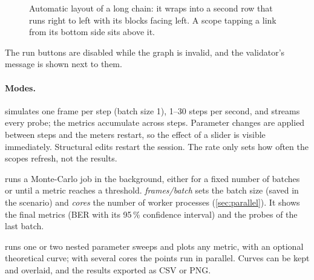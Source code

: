 \begin{figure}[htbp]
\centering
{}
\caption{Automatic layout of a long chain: it wraps into a second row that runs right to left
with its blocks facing left. A scope tapping a link from its bottom side sits above it.}
\label{fig:auto-layout}
\end{figure}

The run buttons are disabled while the graph is invalid, and the validator's message is shown
next to them.

\paragraph{Modes.}
\begin{description}[font=\sffamily\bfseries]
  \item[Live] simulates one frame per step (batch size 1), 1--30 steps per second, and streams
  every probe; the metrics accumulate across steps. Parameter changes are applied between steps
  and the meters restart, so the effect of a slider is visible immediately. Structural edits
  restart the session. The rate only sets how often the scopes refresh, not the results.
  \item[Simulate] runs a Monte-Carlo job in the background, either for a fixed number of
  batches or until a metric reaches a threshold. \emph{frames/batch} sets the batch size (saved in
  the scenario) and \emph{cores} the number of worker processes (\cref{sec:parallel}). It shows the
  final metrics (BER with its 95\,\% confidence interval) and the probes of the last batch.
  \item[Sweep] runs one or two nested parameter sweeps and plots any metric, with an optional
  theoretical curve; with several cores the points run in parallel. Curves can be kept and
  overlaid, and the results exported as CSV or PNG.
\end{description}

